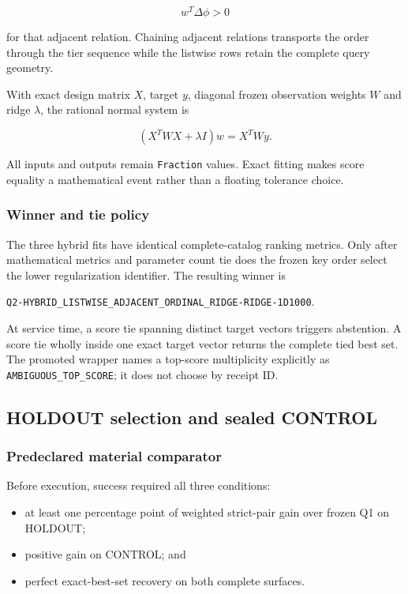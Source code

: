 \[
w^T\Delta\phi>0
\]

for that adjacent relation. Chaining adjacent relations transports the
order through the tier sequence while the listwise rows retain the
complete query geometry.

With exact design matrix \(X\), target \(y\), diagonal frozen
observation weights \(W\) and ridge \(\lambda\), the rational normal
system is

\[
(X^TWX+\lambda I)w=X^TWy.
\]

All inputs and outputs remain \texttt{Fraction} values. Exact fitting
makes score equality a mathematical event rather than a floating
tolerance choice.

\subsubsection{Winner and tie policy}\label{viii-ch07-winner-and-tie-policy}

The three hybrid fits have identical complete-catalog ranking metrics.
Only after mathematical metrics and parameter count tie does the frozen
key order select the lower regularization identifier. The resulting
winner is

\nolinkurl{Q2-HYBRID_LISTWISE_ADJACENT_ORDINAL_RIDGE-RIDGE-1D1000}.

At service time, a score tie spanning distinct target vectors triggers
abstention. A score tie wholly inside one exact target vector returns
the complete tied best set. The promoted wrapper names a top-score
multiplicity explicitly as \texttt{AMBIGUOUS\_TOP\_SCORE}; it does not
choose by receipt ID.

\subsection{HOLDOUT selection and sealed
CONTROL}\label{viii-ch07-holdout-selection-and-sealed-control}

\subsubsection{Predeclared material
comparator}\label{viii-ch07-predeclared-material-comparator}

Before execution, success required all three conditions:

\begin{itemize}
\tightlist
\item
  at least one percentage point of weighted strict-pair gain over frozen
  Q1 on HOLDOUT;
\item
  positive gain on CONTROL; and
\item
  perfect exact-best-set recovery on both complete surfaces.
\end{itemize}

